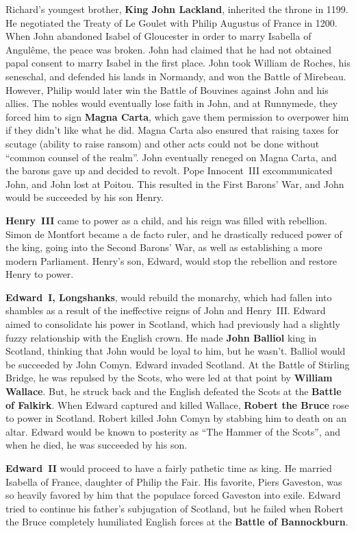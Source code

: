 Richard's youngest brother, \textbf{King John Lackland}, inherited the throne in 1199.
He negotiated the Treaty of Le Goulet with Philip Augustus of France in 1200.
When John abandoned Isabel of Gloucester in order to marry Isabella of Angul\^eme, the peace was broken.
John had claimed that he had not obtained papal consent to marry Isabel in the first place.
John took William de Roches, his seneschal, and defended his lands in Normandy, and won the Battle of Mirebeau.
However, Philip would later win the Battle of Bouvines against John and his allies.
The nobles would eventually lose faith in John, and at Runnymede,
they forced him to sign \textbf{Magna Carta},
which gave them permission to overpower him if they didn't like what he did.
Magna Carta also ensured that raising taxes for scutage (ability to raise ransom) and other acts
could not be done without ``common counsel of the realm''.
John eventually reneged on Magna Carta, and the barons gave up and decided to revolt.
Pope Innocent~III excommunicated John, and John lost at Poitou.
This resulted in the First Barons' War, and John would be succeeded by his son Henry.

\textbf{Henry~III} came to power as a child, and his reign was filled with rebellion.
Simon de Montfort became a de facto ruler, and he drastically reduced power of the king,
going into the Second Barons' War, as well as establishing a more modern Parliament.
Henry's son, Edward, would stop the rebellion and restore Henry to power.

\textbf{Edward~I, Longshanks}, would rebuild the monarchy,
which had fallen into shambles as a result of the ineffective reigns of John and Henry~III\@.
Edward aimed to consolidate his power in Scotland,
which had previously had a slightly fuzzy relationship with the English crown.
He made \textbf{John Balliol} king in Scotland, thinking that John would be loyal to him, but he wasn't.
Balliol would be succeeded by John Comyn.
Edward invaded Scotland.
At the Battle of Stirling Bridge, he was repulsed by the Scots,
who were led at that point by \textbf{William Wallace}.
But, he struck back and the English defeated the Scots at the \textbf{Battle of Falkirk}.
When Edward captured and killed Wallace, \textbf{Robert the Bruce} rose to power in Scotland.
Robert killed John Comyn by stabbing him to death on an altar.
Edward would be known to posterity as ``The Hammer of the Scots'',
and when he died, he was succeeded by his son.

\textbf{Edward~II} would proceed to have a fairly pathetic time as king.
He married Isabella of France, daughter of Philip the Fair.
His favorite, Piers Gaveston, was so heavily favored by him that the populace forced Gaveston into exile.
Edward tried to continue his father's subjugation of Scotland, but he failed
when Robert the Bruce completely humiliated English forces at the \textbf{Battle of Bannockburn}.

